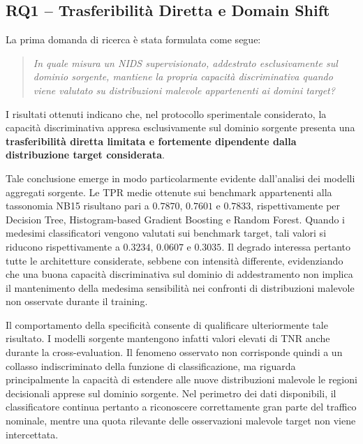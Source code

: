 
\subsection{RQ1 -- Trasferibilità Diretta e Domain Shift}
\label{subsec:conclusioni_rq1}

La prima domanda di ricerca è stata formulata come segue:

\begin{quote}
\textit{In quale misura un NIDS supervisionato, addestrato esclusivamente sul dominio sorgente, mantiene la propria capacità discriminativa quando viene valutato su distribuzioni malevole appartenenti ai domini target?}
\end{quote}

I risultati ottenuti indicano che, nel protocollo sperimentale considerato, la capacità discriminativa appresa esclusivamente sul dominio sorgente presenta una \textbf{trasferibilità diretta limitata e fortemente dipendente dalla distribuzione target considerata}.

Tale conclusione emerge in modo particolarmente evidente dall'analisi dei modelli aggregati sorgente.
Le TPR medie ottenute sui benchmark appartenenti alla tassonomia NB15 risultano pari a $0.7870$, $0.7601$ e $0.7833$, rispettivamente per Decision Tree, Histogram-based Gradient Boosting e Random Forest.
Quando i medesimi classificatori vengono valutati sui benchmark target, tali valori si riducono rispettivamente a $0.3234$, $0.0607$ e $0.3035$.
Il degrado interessa pertanto tutte le architetture considerate, sebbene con intensità differente, evidenziando che una buona capacità discriminativa sul dominio di addestramento non implica il mantenimento della medesima sensibilità nei confronti di distribuzioni malevole non osservate durante il training.

Il comportamento della specificità consente di qualificare ulteriormente tale risultato.
I modelli sorgente mantengono infatti valori elevati di TNR anche durante la cross-evaluation.
Il fenomeno osservato non corrisponde quindi a un collasso indiscriminato della funzione di classificazione, ma riguarda principalmente la capacità di estendere alle nuove distribuzioni malevole le regioni decisionali apprese sul dominio sorgente.
Nel perimetro dei dati disponibili, il classificatore continua pertanto a riconoscere correttamente gran parte del traffico nominale, mentre una quota rilevante delle osservazioni malevole target non viene intercettata.

